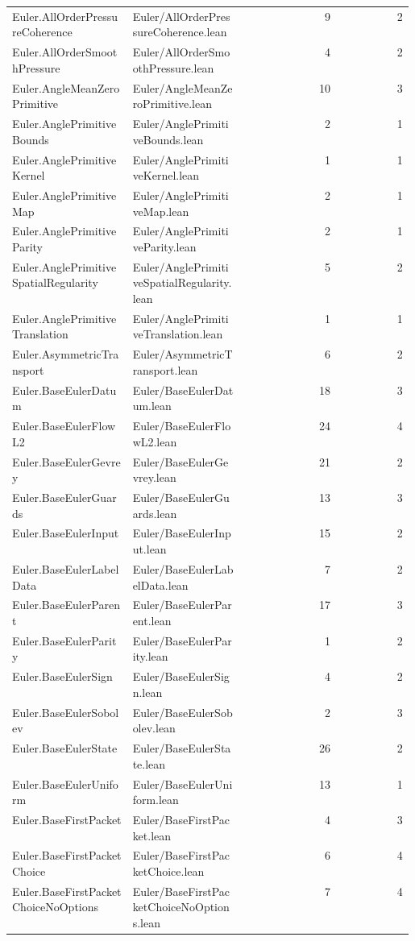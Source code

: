 \begin{longtable}{p{0.30\linewidth}p{0.28\linewidth}rr}
Euler.AllOrderPressureCoherence & Euler/AllOrderPressureCoherence.lean & 9 & 2\\
Euler.AllOrderSmoothPressure & Euler/AllOrderSmoothPressure.lean & 4 & 2\\
Euler.AngleMeanZeroPrimitive & Euler/AngleMeanZeroPrimitive.lean & 10 & 3\\
Euler.AnglePrimitiveBounds & Euler/AnglePrimitiveBounds.lean & 2 & 1\\
Euler.AnglePrimitiveKernel & Euler/AnglePrimitiveKernel.lean & 1 & 1\\
Euler.AnglePrimitiveMap & Euler/AnglePrimitiveMap.lean & 2 & 1\\
Euler.AnglePrimitiveParity & Euler/AnglePrimitiveParity.lean & 2 & 1\\
Euler.AnglePrimitiveSpatialRegularity & Euler/AnglePrimitiveSpatialRegularity.lean & 5 & 2\\
Euler.AnglePrimitiveTranslation & Euler/AnglePrimitiveTranslation.lean & 1 & 1\\
Euler.AsymmetricTransport & Euler/AsymmetricTransport.lean & 6 & 2\\
Euler.BaseEulerDatum & Euler/BaseEulerDatum.lean & 18 & 3\\
Euler.BaseEulerFlowL2 & Euler/BaseEulerFlowL2.lean & 24 & 4\\
Euler.BaseEulerGevrey & Euler/BaseEulerGevrey.lean & 21 & 2\\
Euler.BaseEulerGuards & Euler/BaseEulerGuards.lean & 13 & 3\\
Euler.BaseEulerInput & Euler/BaseEulerInput.lean & 15 & 2\\
Euler.BaseEulerLabelData & Euler/BaseEulerLabelData.lean & 7 & 2\\
Euler.BaseEulerParent & Euler/BaseEulerParent.lean & 17 & 3\\
Euler.BaseEulerParity & Euler/BaseEulerParity.lean & 1 & 2\\
Euler.BaseEulerSign & Euler/BaseEulerSign.lean & 4 & 2\\
Euler.BaseEulerSobolev & Euler/BaseEulerSobolev.lean & 2 & 3\\
Euler.BaseEulerState & Euler/BaseEulerState.lean & 26 & 2\\
Euler.BaseEulerUniform & Euler/BaseEulerUniform.lean & 13 & 1\\
Euler.BaseFirstPacket & Euler/BaseFirstPacket.lean & 4 & 3\\
Euler.BaseFirstPacketChoice & Euler/BaseFirstPacketChoice.lean & 6 & 4\\
Euler.BaseFirstPacketChoiceNoOptions & Euler/BaseFirstPacketChoiceNoOptions.lean & 7 & 4\\

\end{longtable}

